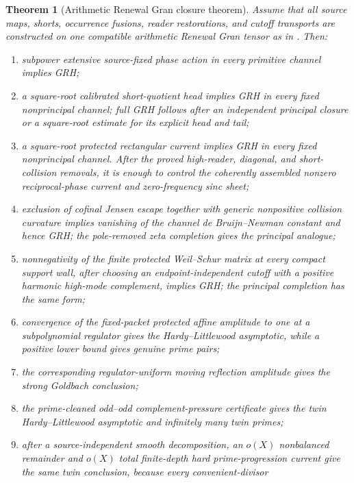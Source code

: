 \documentclass[11pt]{article}
\newtheorem{theorem}{Theorem}[section]
\theoremstyle{definition}
\theoremstyle{remark}
\begin{document}
\begin{theorem}[Arithmetic Renewal Gran closure theorem]
\label{thm:combined-closure}
Assume that all source maps, shorts, occurrence fusions, reader restorations,
and cutoff transports are constructed on one compatible arithmetic Renewal
Gran tensor as in .  Then:
\begin{enumerate}[label=\textup{(C\arabic*)},leftmargin=3.2em]
\item subpower extensive source-fixed phase action in every primitive channel
      implies GRH;
\item a square-root calibrated short-quotient head implies GRH in every fixed
      nonprincipal channel; full GRH follows after an independent principal
      closure or a square-root estimate for its explicit head and tail;
\item a square-root protected rectangular current implies GRH in every fixed
      nonprincipal channel.  After the proved high-reader, diagonal, and
      short-collision removals, it is enough to control the coherently
      assembled nonzero reciprocal-phase current and zero-frequency sinc
      sheet;
\item exclusion of cofinal Jensen escape together with generic nonpositive
      collision curvature implies vanishing of the channel
      de Bruijn--Newman constant and hence GRH; the pole-removed zeta
      completion gives the principal analogue;
\item nonnegativity of the finite protected Weil--Schur matrix at every
      compact support wall, after choosing an endpoint-independent cutoff with a
      positive harmonic high-mode complement, implies GRH; the principal
      completion has the same form;
\item convergence of the fixed-packet protected affine amplitude to one at a
      subpolynomial regulator gives the Hardy--Littlewood asymptotic, while a
      positive lower bound gives genuine prime pairs;
\item the corresponding regulator-uniform moving reflection amplitude gives
      the strong Goldbach conclusion;
\item the prime-cleaned odd--odd complement-pressure certificate gives the
      twin Hardy--Littlewood asymptotic and infinitely many twin primes;
\item after a source-independent smooth decomposition, an $o(X)$ nonbalanced
      remainder and $o(X)$ total finite-depth hard prime-progression current
      give the same twin conclusion, because every convenient-divisor

\end{enumerate}
\end{theorem}
\end{document}
